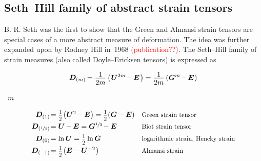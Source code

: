 \subsection*{Seth\hbox{--}Hill family of abstract strain tensors}

B. R. Seth was the first to show that the Green and Almansi strain tensors are special cases of a more abstract measure of deformation.
The idea was further expanded upon by Rodney Hill in~1968 \textcolor{red}{(publication??)}.
The Seth\hbox{--}Hill family of strain measures (also called Doyle\hbox{--}Ericksen tensors) is expressed as

\nopagebreak\vspace{-0.1em}\begin{equation*}
\displaystyle \bm{D}_{(m)} \hspace{-0.2ex}
= \frac{\raisebox{-0.2em}{1}}{2m} \left( \hspace{.1ex} \bm{U}^{2m} \hspace{-0.4ex} - \UnitDyad \hspace{.2ex} \right)
= \frac{\raisebox{-0.2em}{1}}{2m} \left( \bm{G}^{m} \hspace{-0.4ex} - \UnitDyad \hspace{.1ex} \right) \end{equation*}

\vspace{.1em} \noindent {}~$m$

\nopagebreak\begin{equation*}
\begin{array}{r@{\hspace{0.1em}}ll}
\bm{D}_{(1)} & = \smalldisplaystyleonehalf \hspace{-0.25ex} \left( \bm{U}^{2} \hspace{-0.25ex} - \UnitDyad \right) = \smalldisplaystyleonehalf (\bm{G} - \UnitDyad) & \text{\scalebox{.9}{Green strain tensor}}
\\[.4em]
\bm{D}_{(\nicefrac{1}{2})} & = \bm{U} \hspace{-0.15ex} - \UnitDyad = \bm{G}^{\hspace{.1ex}\nicefrac{1}{2}} \hspace{-0.25ex} - \UnitDyad & \text{\scalebox{.9}{Biot strain tensor}}
\\[.4em]
\bm{D}_{(0)} & = \ln \bm{U} = \smalldisplaystyleonehalf \ln \bm{G} & \text{\scalebox{.9}{logarithmic strain, Hencky strain}}
\\[.4em]
\bm{D}_{(-\hspace{-0.1ex}1)} & = \smalldisplaystyleonehalf \hspace{-0.25ex} \left( \hspace{-0.1ex} \UnitDyad - \bm{U}^{-2} \hspace{.1ex} \right) & \text{\scalebox{.9}{Almansi strain}}
\end{array}
\end{equation*}

